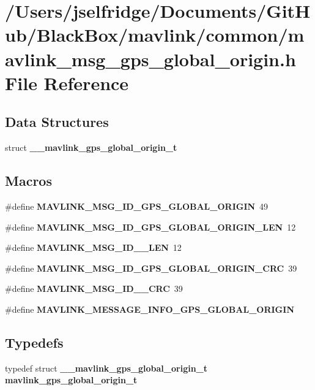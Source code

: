 \section{/\+Users/jselfridge/\+Documents/\+Git\+Hub/\+Black\+Box/mavlink/common/mavlink\+\_\+msg\+\_\+gps\+\_\+global\+\_\+origin.h File Reference}
\label{mavlink__msg__gps__global__origin_8h}
\subsection*{Data Structures}
\begin{DoxyCompactItemize}
\item 
struct \textbf{ \+\_\+\+\_\+mavlink\+\_\+gps\+\_\+global\+\_\+origin\+\_\+t}
\end{DoxyCompactItemize}
\subsection*{Macros}
\begin{DoxyCompactItemize}
\item 
\#define \textbf{ M\+A\+V\+L\+I\+N\+K\+\_\+\+M\+S\+G\+\_\+\+I\+D\+\_\+\+G\+P\+S\+\_\+\+G\+L\+O\+B\+A\+L\+\_\+\+O\+R\+I\+G\+IN}~49
\item 
\#define \textbf{ M\+A\+V\+L\+I\+N\+K\+\_\+\+M\+S\+G\+\_\+\+I\+D\+\_\+\+G\+P\+S\+\_\+\+G\+L\+O\+B\+A\+L\+\_\+\+O\+R\+I\+G\+I\+N\+\_\+\+L\+EN}~12
\item 
\#define \textbf{ M\+A\+V\+L\+I\+N\+K\+\_\+\+M\+S\+G\+\_\+\+I\+D\+\_\+\_\+\+L\+EN}~12
\item 
\#define \textbf{ M\+A\+V\+L\+I\+N\+K\+\_\+\+M\+S\+G\+\_\+\+I\+D\+\_\+\+G\+P\+S\+\_\+\+G\+L\+O\+B\+A\+L\+\_\+\+O\+R\+I\+G\+I\+N\+\_\+\+C\+RC}~39
\item 
\#define \textbf{ M\+A\+V\+L\+I\+N\+K\+\_\+\+M\+S\+G\+\_\+\+I\+D\+\_\+\_\+\+C\+RC}~39
\item 
\#define \textbf{ M\+A\+V\+L\+I\+N\+K\+\_\+\+M\+E\+S\+S\+A\+G\+E\+\_\+\+I\+N\+F\+O\+\_\+\+G\+P\+S\+\_\+\+G\+L\+O\+B\+A\+L\+\_\+\+O\+R\+I\+G\+IN}
\end{DoxyCompactItemize}
\subsection*{Typedefs}
\begin{DoxyCompactItemize}
\item 
typedef struct \textbf{ \+\_\+\+\_\+mavlink\+\_\+gps\+\_\+global\+\_\+origin\+\_\+t} \textbf{ mavlink\+\_\+gps\+\_\+global\+\_\+origin\+\_\+t}
\end{DoxyCompactItemize}


